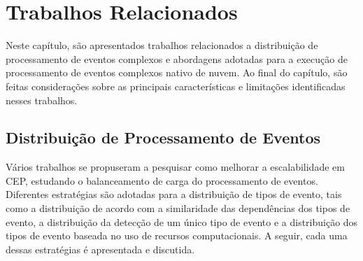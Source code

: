 \chapter{Trabalhos Relacionados}
\label{cap:trabalhos}



Neste capítulo, são apresentados trabalhos relacionados a distribuição de processamento de eventos complexos e abordagens adotadas para a execução de processamento de eventos complexos nativo de nuvem. Ao final do capítulo, são feitas considerações sobre as principais características e limitações identificadas nesses trabalhos. 

\section{Distribuição de Processamento de Eventos}

Vários trabalhos se propuseram a pesquisar como melhorar a escalabilidade em CEP, estudando o balanceamento de carga do processamento de eventos. 
Diferentes estratégias são adotadas para a distribuição de tipos de evento, tais como a distribuição de acordo com a similaridade das dependências dos tipos de evento, a distribuição da detecção de um único tipo de evento e a distribuição dos tipos de evento baseada no uso de recursos computacionais. A seguir, cada uma dessas estratégias é apresentada e discutida.



